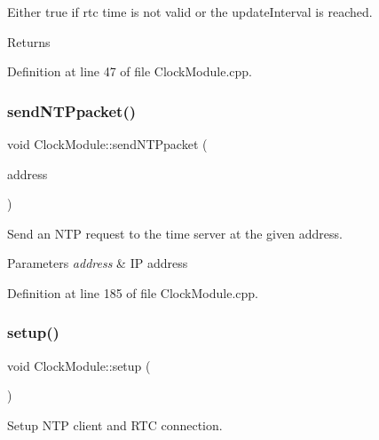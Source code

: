 Either true if rtc time is not valid or the update\+Interval is reached. 

\begin{DoxyReturn}{Returns}

\end{DoxyReturn}


Definition at line 47 of file Clock\+Module.\+cpp.

\mbox{\label{class_clock_module_a266855ecf4aa1f466d1a3556caff008c}} 
\subsubsection{\texorpdfstring{sendNTPpacket()}{sendNTPpacket()}}
{\footnotesize\ttfamily void Clock\+Module\+::send\+N\+T\+Ppacket (\begin{DoxyParamCaption}\item[{I\+P\+Address \&}]{address }\end{DoxyParamCaption})\hspace{0.3cm}{\ttfamily [private]}}



Send an N\+TP request to the time server at the given address. 


\begin{DoxyParams}{Parameters}
{\em address} & IP address \\
\hline
\end{DoxyParams}


Definition at line 185 of file Clock\+Module.\+cpp.

\mbox{\label{class_clock_module_a6113cfe778efff0aa237696f85516796}} 
\subsubsection{\texorpdfstring{setup()}{setup()}}
{\footnotesize\ttfamily void Clock\+Module\+::setup (\begin{DoxyParamCaption}{ }\end{DoxyParamCaption})}



Setup N\+TP client and R\+TC connection. 



